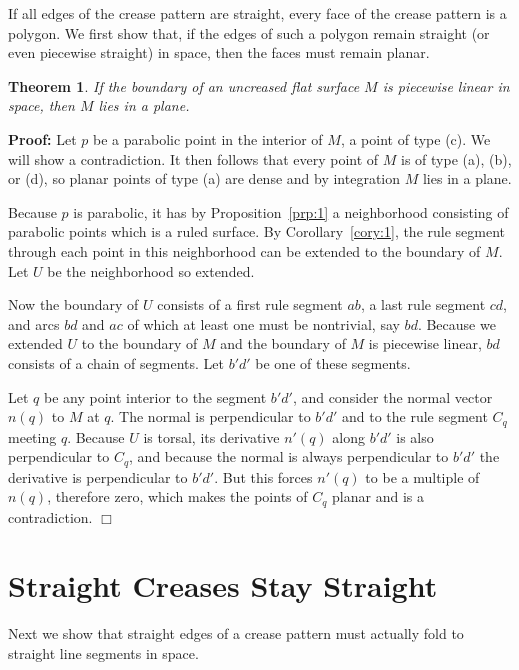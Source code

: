 \documentclass[11pt,letterpaper]{article}
\newtheorem{theorem}{Theorem}
\newenvironment{proof}{\noindent\textbf{Proof: }\ignorespaces}
  {\hspace*{\fill}$\Box$\medskip}
\begin{document}
If all edges of the crease pattern are straight,
every face of the crease pattern is a polygon.
We first show that, if the edges of such a polygon remain
straight (or even piecewise straight) in space,
then the faces must remain planar.

\begin{theorem}\label{thm:5}
  If the boundary of an uncreased flat surface $M$ is piecewise
  linear in space, then $M$ lies in a plane.
\end{theorem}
\begin{proof}
  Let $p$ be a parabolic point in the interior of $M$, a point of type (c).  We will
  show a contradiction.  It then follows that every point of $M$ is of
  type (a), (b), or (d), so planar points of type (a) are dense and by
  integration $M$ lies in a plane.

  Because $p$ is parabolic, it has by Proposition~\ref{prp:1} a
  neighborhood consisting of parabolic points which is a ruled
  surface.  By Corollary~\ref{cory:1},
  the rule segment through each point in this neighborhood can be
  extended to the boundary of $M$.  Let $U$ be the neighborhood so
  extended.

  Now the boundary of $U$ consists of a first rule segment $ab$, a last
  rule segment $cd$, and arcs $bd$ and $ac$ of which at least one must be
  nontrivial, say $bd$.  Because we extended $U$ to the boundary of
  $M$ and the boundary of $M$ is piecewise linear, $bd$ consists of a
  chain of segments.  Let $b'd'$ be one of these segments.

  Let $q$ be any point interior to the segment $b'd'$, and consider
  the normal vector $n(q)$ to $M$ at $q$.  The normal is perpendicular
  to $b'd'$ and to the rule segment $C_q$ meeting $q$.  Because $U$ is
  torsal, its derivative $n'(q)$ along $b'd'$ is also perpendicular to
  $C_q$, and because the normal is always perpendicular to $b'd'$ the
  derivative is perpendicular to $b'd'$.  But this forces $n'(q)$ to
  be a multiple of $n(q)$, therefore zero, which makes the points of
  $C_q$ planar and is a contradiction.
\end{proof}



\section{Straight Creases Stay Straight}

Next we show that straight edges of a crease pattern
must actually fold to straight line segments in space.
\end{document}
